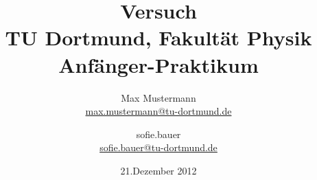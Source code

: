 

\usepackage{wrapfig}
\usepackage{caption}
\usepackage{float}
\usepackage{blindtext}




\title{Versuch\\				%
\large TU Dortmund, Fakultät Physik\\ 
\normalsize Anfänger-Praktikum}

\author{Max Mustermann\\			%
{\small \href{max.mustermann@tu-dortmund.de}{max.mustermann@tu-dortmund.de}}	%
\and						%
sofie.bauer\\					%
{\small \href{sofie.bauer@tu-dortmund.de}{sofie.bauer@tu-dortmund.de}}		%
}
\date{21.Dezember 2012}				%





\maketitle					%
\thispagestyle{empty} 				%



\tableofcontents


\newpage					%


